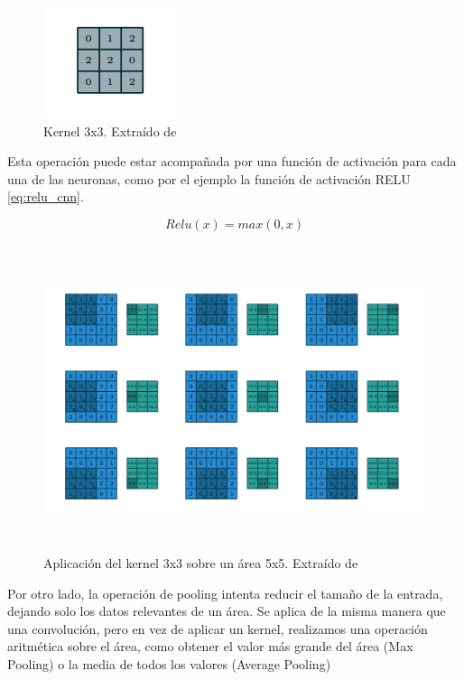 \begin{figure}
    \centering
    \label{fig:kernel}
    \includegraphics{img/memoria/3/kernel.png}
    \caption{Kernel 3x3. Extraído de \cite{convolution_guide}}
\end{figure}

Esta operación puede estar acompañada por una función de activación para
cada una de las neuronas, como por el ejemplo la función de activación
RELU \eqref{eq:relu_cnn}.

\begin{equation}
    \label{eq:relu_cnn}
    Relu(x) = max(0,x)
\end{equation}

\begin{figure}
    \centering
    \includegraphics[width=5.90556in,height=3.52639in]{img/memoria/3/convolution.png}
    \caption{Aplicación del kernel 3x3 sobre un área 5x5. Extraído de \cite{convolution_guide}}
    \label{fig:cnn_operation}
\end{figure}

Por otro lado, la operación de pooling intenta reducir el tamaño de la
entrada, dejando solo los datos relevantes de un área. Se aplica de la
misma manera que una convolución, pero en vez de aplicar un kernel,
realizamos una operación aritmética sobre el área, como obtener el valor
más grande del área (Max Pooling) o la media de todos los valores
(Average Pooling)

